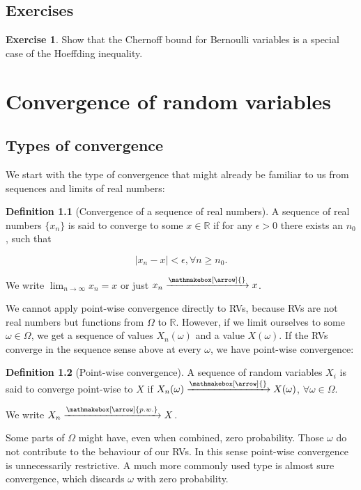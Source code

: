 \documentclass{book}
\theoremstyle{plain}%
\theoremstyle{definition}
\newtheorem{definition}{Definition}[section]
\newtheorem{exercise}{Exercise}[chapter]
\newlength{\arrow}
\newcommand*{\myrightarrow}[1]{\xrightarrow{\mathmakebox[\arrow]{#1}}}
\begin{document}
\section*{Exercises}

\begin{exercise}
Show that the Chernoff bound for Bernoulli variables is a special case of the Hoeffding inequality.
\end{exercise}



\chapter{Convergence of random variables}

\section{Types of convergence}

We start with the type of convergence that might already be familiar to us from sequences and limits of real numbers:

\begin{definition}[Convergence of a sequence of real numbers]

A sequence of real numbers $\{x_n\}$ is said to converge to some $x \in \mathbb{R}$ if for any $\epsilon > 0$ there exists an $n_0$, such that 

$$|x_n - x| < \epsilon, \forall n \geq n_0.$$

We write $\lim_{n \rightarrow \infty} x_n = x$ or just $x_n \myrightarrow{} x$.
\end{definition}

We cannot apply point-wise convergence directly to RVs, because RVs are not real numbers but functions from $\Omega$ to $\mathbb{R}$. However, if we limit ourselves to some $\omega \in \Omega$, we get a sequence of values $X_n(\omega)$ and a value $X(\omega)$. If the RVs converge in the sequence sense above at every $\omega$, we have point-wise convergence:  

\begin{definition}[Point-wise convergence]
A sequence of random variables ${X_i}$ is said to converge point-wise to $X$ if $X_n(\omega) \myrightarrow{}  X(\omega)$, $\forall \omega \in \Omega$.

We write $X_n \myrightarrow{p.w.} X$.
\end{definition}

Some parts of $\Omega$ might have, even when combined, zero probability. Those $\omega$ do not contribute to the behaviour of our RVs. In this sense point-wise convergence is unnecessarily restrictive. A much more commonly used type is almost sure convergence, which discards $\omega$ with zero probability.
\end{document}
